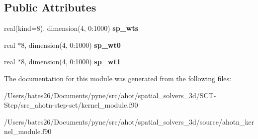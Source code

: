 \subsection*{Public Attributes}
\begin{DoxyCompactItemize}
\item 
\hypertarget{classkernel__module_ad2a8647b9f46d5c36966764ba8084d64}{real(kind=8), dimension(4, 0\+:1000) {\bfseries sp\+\_\+wts}}\label{classkernel__module_ad2a8647b9f46d5c36966764ba8084d64}

\item 
\hypertarget{classkernel__module_a56176b696afbc435b81f6c7ebd75f287}{real $\ast$8, dimension(4, 0\+:1000) {\bfseries sp\+\_\+wt0}}\label{classkernel__module_a56176b696afbc435b81f6c7ebd75f287}

\item 
\hypertarget{classkernel__module_a9c85ae778290368b8125e6548542c20c}{real $\ast$8, dimension(4, 0\+:1000) {\bfseries sp\+\_\+wt1}}\label{classkernel__module_a9c85ae778290368b8125e6548542c20c}

\end{DoxyCompactItemize}


The documentation for this module was generated from the following files\+:\begin{DoxyCompactItemize}
\item 
/\+Users/bates26/\+Documents/pyne/src/ahot/spatial\+\_\+solvers\+\_\+3d/\+S\+C\+T-\/\+Step/src\+\_\+ahotn-\/step-\/sct/kernel\+\_\+module.\+f90\item 
/\+Users/bates26/\+Documents/pyne/src/ahot/spatial\+\_\+solvers\+\_\+3d/source/ahotn\+\_\+kernel\+\_\+module.\+f90\end{DoxyCompactItemize}
